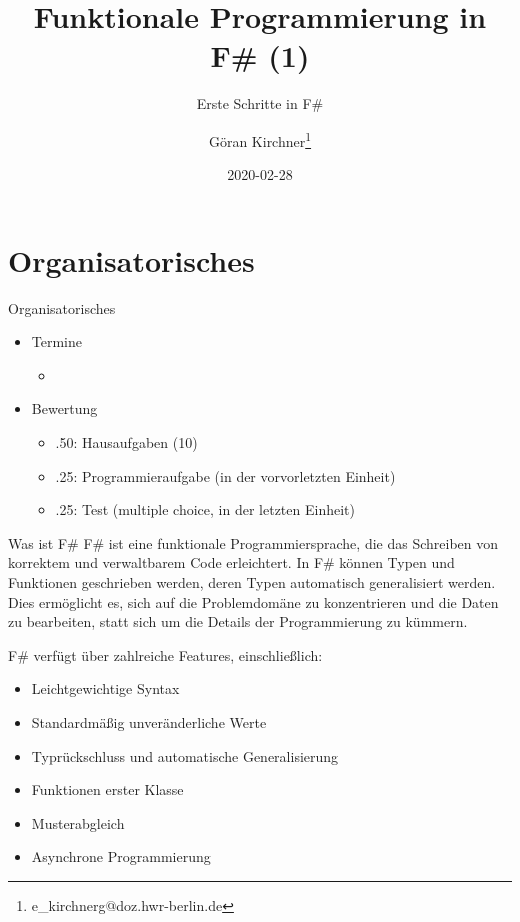 \documentclass[t]{beamer}
\author{Göran Kirchner\thanks{e\_kirchnerg@doz.hwr-berlin.de}}
\date{2020-02-28}
\title{Funktionale Programmierung in F\# (1)}
\subtitle{Erste Schritte in F\#}
\begin{document}
\maketitle

\section{Organisatorisches }
\label{sec:orge88c77d}

\begin{frame}[label={sec:org9f088b4}]{Organisatorisches}
\begin{itemize}
\item Termine
\begin{itemize}
\item\relax [28.02, 12.03, 27.03, 23.04, 24.04]
\end{itemize}
\item Bewertung
\begin{itemize}
\item .50: Hausaufgaben (10)
\item .25: Programmieraufgabe (in der vorvorletzten Einheit)
\item .25: Test (multiple choice, in der letzten Einheit)
\end{itemize}
\end{itemize}
\end{frame}

\begin{frame}[label={sec:org53a3779}]{Was ist F\#}
F\# ist eine funktionale Programmiersprache, die das Schreiben von korrektem und verwaltbarem Code erleichtert.
In F\# können Typen und Funktionen geschrieben werden, deren Typen automatisch generalisiert werden. Dies ermöglicht es, sich auf die Problemdomäne zu konzentrieren und die Daten zu bearbeiten, statt sich um die Details der Programmierung zu kümmern.

F\# verfügt über zahlreiche Features, einschließlich:
\begin{itemize}
\item Leichtgewichtige Syntax
\item Standardmäßig unveränderliche Werte
\item Typrückschluss und automatische Generalisierung
\item Funktionen erster Klasse
\item Musterabgleich
\item Asynchrone Programmierung
\end{itemize}
\end{frame}
\end{document}
